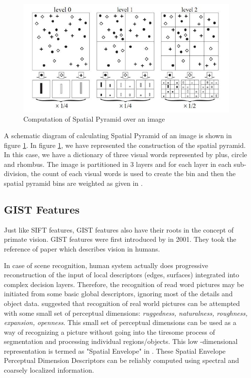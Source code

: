  \begin{center}
\begin{figure}
\centering
\includegraphics[width=\linewidth]{./Pictures/SIFT/pyramidCompute.jpg}
\caption{Computation of Spatial Pyramid over an image }
\label{fig:pyramidCompute}
\end{figure}
\end{center}
A schematic diagram of  calculating Spatial Pyramid of an image is shown in figure \ref{fig:pyramidCompute}. In figure \ref{fig:pyramidCompute}, we have represented the construction of the spatial pyramid. In this case, we have a dictionary of three visual words represented by plus, circle and rhombus. The image is partitioned in 3 layers and for each layer in each sub-division, the count of each visual words is used to create the bin and then the spatial pyramid bins are weighted as given in \citet*{bagOfWords}.
\subsection{GIST Features}
Just like SIFT features, GIST features also have their roots in the concept of primate vision. GIST features were first introduced by \citet*{GIST} in 2001. They took the reference of paper \citet*{barrow} which describes vision in humans. 
 
In case of scene recognition, human system actually does progressive reconstruction of the input of local descriptors (edges, surfaces) integrated into complex decision layers. Therefore, the recognition of read word pictures may be initiated from some basic global descriptors, ignoring most of the details and object data.
 suggested that recognition of real world pictures can be attempted with some small set of perceptual dimensions:  \emph{ruggedness, naturalness, roughness, expansion, openness}. This small set of perceptual dimensions can be used as a way of recognizing a picture without going into the tiresome process of segmentation and processing individual regions/objects. This low -dimensional representation is termed as "Spatial Envelope" in \citet*{GIST}. These Spatial Envelope Perceptual Dimension Descriptors can be reliably computed using spectral and coarsely localized information.

